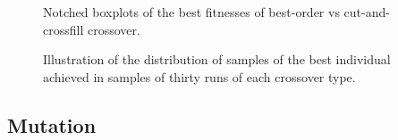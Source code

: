 \documentclass[12pt,twocolumn,oneside]{osajnl}
\begin{document}
\begin{figure}[htbp]
\centering
{}
\caption{Notched boxplots of the best fitnesses of best-order vs cut-and-crossfill crossover.}
\label{fig:bovboxplot}
\end{figure}

\begin{figure}[htbp]
\centering
{}
\caption{Illustration of the distribution of samples of the best individual achieved in samples of thirty runs of each crossover type.}
\label{fig:bocchist}
\end{figure}

\subsection{Mutation}
\end{document}
